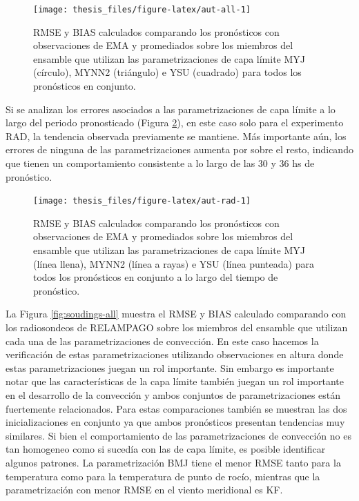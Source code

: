 \documentclass[12pt,oneside,a4paper]{reedthesis}
\begin{document}
\begin{figure}

{\centering \texttt{[image: thesis\_files/figure-latex/aut-all-1]} 

}

\caption{RMSE y BIAS calculados comparando los pronósticos con observaciones de EMA y promediados sobre los miembros del ensamble que utilizan las parametrizaciones de capa límite MYJ (círculo), MYNN2 (triángulo) e YSU (cuadrado) para todos los pronósticos en conjunto.}\label{fig:aut-all}
\end{figure}
Si se analizan los errores asociados a las parametrizaciones de capa límite a lo largo del periodo pronosticado (Figura \ref{fig:aut-rad}), en este caso solo para el experimento RAD, la tendencia observada previamente se mantiene. Más importante aún, los errores de ninguna de las parametrizaciones aumenta por sobre el resto, indicando que tienen un comportamiento consistente a lo largo de las 30 y 36 hs de pronóstico.


\begin{figure}

{\centering \texttt{[image: thesis\_files/figure-latex/aut-rad-1]} 

}

\caption{RMSE y BIAS calculados comparando los pronósticos con observaciones de EMA y promediados sobre los miembros del ensamble que utilizan las parametrizaciones de capa límite MYJ (línea llena), MYNN2 (línea a rayas) e YSU (línea punteada) para todos los pronósticos en conjunto a lo largo del tiempo de pronóstico.}\label{fig:aut-rad}
\end{figure}
La Figura \ref{fig:soudings-all} muestra el RMSE y BIAS calculado comparando con los radiosondeos de RELAMPAGO sobre los miembros del ensamble que utilizan cada una de las parametrizaciones de convección. En este caso hacemos la verificación de estas parametrizaciones utilizando observaciones en altura donde estas parametrizaciones juegan un rol importante. Sin embargo es importante notar que las características de la capa límite también juegan un rol importante en el desarrollo de la convección y ambos conjuntos de parametrizaciones están fuertemente relacionados. Para estas comparaciones también se muestran las dos inicializaciones en conjunto ya que ambos pronósticos presentan tendencias muy similares. Si bien el comportamiento de las parametrizaciones de convección no es tan homogeneo como si sucedía con las de capa límite, es posible identificar algunos patrones. La parametrización BMJ tiene el menor RMSE tanto para la temperatura como para la temperatura de punto de rocío, mientras que la parametrización con menor RMSE en el viento meridional es KF.
\end{document}
